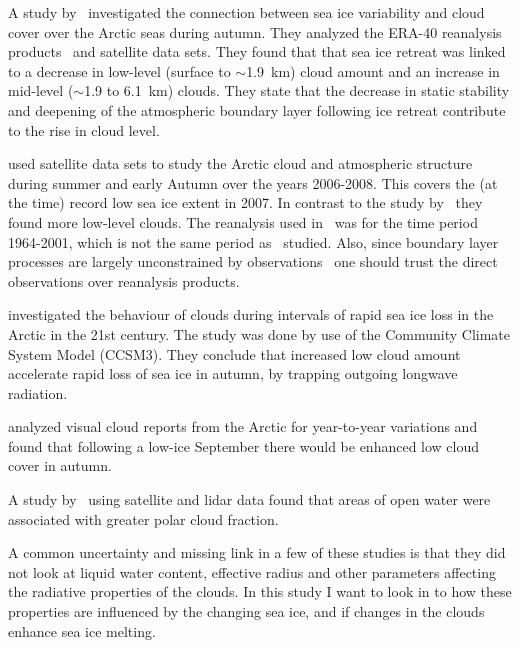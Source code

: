 A study by~\citet{Schweiger2008} investigated the connection between sea ice variability and cloud cover over the Arctic seas during autumn. They analyzed the ERA-40 reanalysis products~\citep{ecmwf} and satellite data sets. %
They found that that sea ice retreat was linked to a decrease in low-level (surface to $\sim$1.9~km) cloud amount and an increase in mid-level ($\sim$1.9 to 6.1~km) clouds. They state that the decrease in static stability and deepening of the atmospheric boundary layer following ice retreat contribute to the rise in cloud level. 

\citet{Kay2009} used satellite data sets to study the Arctic cloud and atmospheric structure during summer and early Autumn over the years 2006-2008. This covers the (at the time) record low sea ice extent in 2007. In contrast to the study by~\citet{Schweiger2008} they found more low-level clouds. The reanalysis used in~\citet{Schweiger2008} was for the time period 1964-2001, which is not the same period as~\citet{Kay2009} studied. Also, since boundary layer processes are largely unconstrained by observations~\citep{Kay2009} one should trust the direct observations over reanalysis products.

\citet{Vavrus2010} investigated the behaviour of clouds during intervals of rapid sea ice loss in the Arctic in the 21st century. The study was done by use of the Community Climate System Model (CCSM3). They conclude that increased low cloud amount accelerate rapid loss of sea ice in autumn, by trapping outgoing longwave radiation.

\citet{Eastman2010a} analyzed visual cloud reports from the Arctic for year-to-year variations and found that following a low-ice September there would be enhanced low cloud cover in autumn.

A study by~\citet{Palm2010} using satellite and lidar data  found that areas of open water were associated with greater polar cloud fraction.

A common uncertainty and missing link in a few of these studies is that they did not look at liquid water content, effective radius and other parameters affecting the radiative properties of the clouds. In this study I want to look in to how these properties are influenced by the changing sea ice, and if changes in the clouds enhance sea ice melting.


